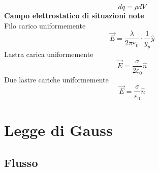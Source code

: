 \documentclass[twoside]{article}
\begin{document}
\begin{equation}
    \boxed{dq = \rho dV}
\end{equation}
\textbf{Campo elettrostatico di situazioni note}\\
\noindent
Filo carico uniformemente
\begin{equation}
    \boxed{\vec{E} = \displaystyle \frac{\lambda }{2 \pi \varepsilon_0} \cdot \frac{1}{y_p} \hat{y}}
\end{equation}
Lastra carica uniformemente
\begin{equation}
    \boxed{\vec{E} = \displaystyle \frac{\sigma}{2\varepsilon_0} \hat{n}}
\end{equation}
Due lastre cariche uniformemente
\begin{equation}
    \boxed{\vec{E} = \displaystyle \frac{\sigma}{\varepsilon_0} \hat{n}}
\end{equation}
\newpage
\section{Legge di Gauss}
\subsection{Flusso}
\end{document}
